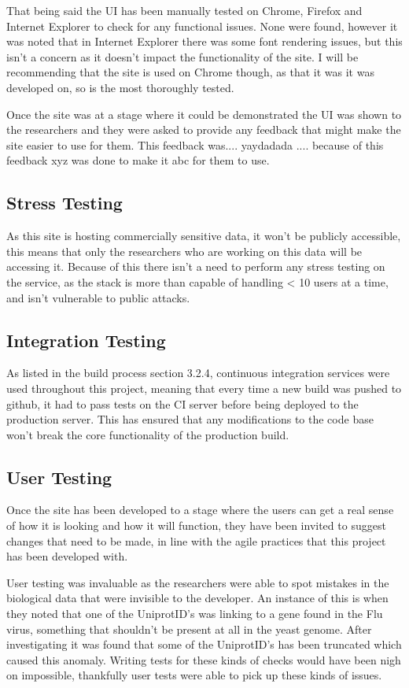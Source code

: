 That being said the UI has been manually tested on Chrome, Firefox and Internet Explorer to check for any functional issues. None were found, however it was noted that in Internet Explorer there was some font rendering issues, but this isn't a concern as it doesn't impact the functionality of the site. I will be recommending that the site is used on Chrome though, as that it was it was developed on, so is the most thoroughly tested. 

Once the site was at a stage where it could be demonstrated the UI was shown to the researchers and they were asked to provide any feedback that might make the site easier to use for them. This feedback was.... yaydadada .... because of this feedback xyz was done to make it abc for them to use.

\subsection{Stress Testing}
As this site is hosting commercially sensitive data, it won't be publicly accessible, this means that only the researchers who are working on this data will be accessing it. Because of this there isn't a need to perform any stress testing on the service, as the stack is more than capable of handling < 10 users at a time, and isn't vulnerable to public attacks. 

\subsection{Integration Testing}
As listed in the build process section 3.2.4, continuous integration services were used throughout this project, meaning that every time a new build was pushed to github, it had to pass tests on the CI server before being deployed to the production server. This has ensured that any modifications to the code base won't break the core functionality of the production build. 

\subsection{User Testing}
Once the site has been developed to a stage where the users can get a real sense of how it is looking and how it will function, they have been invited to suggest changes that need to be made, in line with the agile practices that this project has been developed with. 

User testing was invaluable as the researchers were able to spot mistakes in the biological data that were invisible to the developer. An instance of this is when they noted that one of the UniprotID's was linking to a gene found in the Flu virus, something that shouldn't be present at all in the yeast genome. After investigating it was found that some of the UniprotID's has been truncated which caused this anomaly. Writing tests for these kinds of checks would have been nigh on impossible, thankfully user tests were able to pick up these kinds of issues. 

